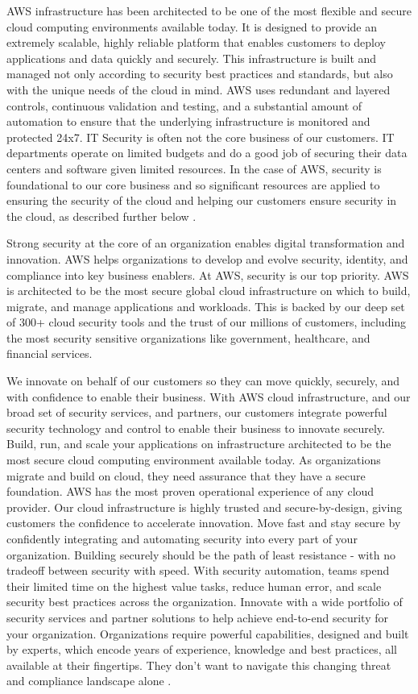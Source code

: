 AWS infrastructure has been architected to be one of the most flexible and secure cloud computing environments available today. It is designed to provide an extremely scalable, highly reliable platform that enables customers to deploy applications and data quickly and securely. This infrastructure is built and managed not only according to security best practices and standards, but also with the unique needs of the cloud in mind. AWS uses redundant and layered controls, continuous validation and testing, and a substantial amount of automation to ensure that the underlying infrastructure is monitored and protected 24x7. IT Security is often not the core business of our customers. IT departments operate on limited budgets and do a good job of securing their data centers and software given limited resources. In the case of AWS, security is foundational to our core business and so significant resources are applied to ensuring the security of the cloud and helping our customers ensure security in the cloud, as described further below \cite{AWSCloudComputing}. 

Strong security at the core of an organization enables digital transformation and innovation. AWS helps organizations to develop and evolve security, identity, and compliance into key business enablers. At AWS, security is our top priority. AWS is architected to be the most secure global cloud infrastructure on which to build, migrate, and manage applications and workloads. This is backed by our deep set of 300+ cloud security tools and the trust of our millions of customers, including the most security sensitive organizations like government, healthcare, and financial services.

We innovate on behalf of our customers so they can move quickly, securely, and with confidence to enable their business. With AWS cloud infrastructure, and our broad set of security services, and partners, our customers integrate powerful security technology and control to enable their business to innovate securely. Build, run, and scale your applications on infrastructure architected to be the most secure cloud computing environment available today. As organizations migrate and build on cloud, they need assurance that they have a secure foundation. AWS has the most proven operational experience of any cloud provider. Our cloud infrastructure is highly trusted and secure-by-design, giving customers the confidence to accelerate innovation. Move fast and stay secure by confidently integrating and automating security into every part of your organization. Building securely should be the path of least resistance - with no tradeoff between security with speed. With security automation, teams spend their limited time on the highest value tasks, reduce human error, and scale security best practices across the organization. Innovate with a wide portfolio of security services and partner solutions to help achieve end-to-end security for your organization. Organizations require powerful capabilities, designed and built by experts, which encode years of experience, knowledge and best practices, all available at their fingertips. They don't want to navigate this changing threat and compliance landscape alone \cite{AWSSecurity}.


